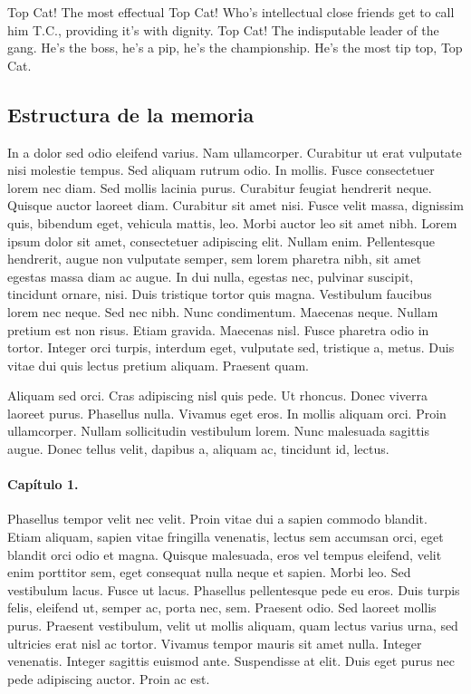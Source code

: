 Top Cat! The most effectual Top Cat! Who's intellectual close friends get to call him T.C., providing it's with dignity. Top Cat! The indisputable leader of the gang. He's the boss, he's a pip, he's the championship. He's the most tip top, Top Cat.

%
%
\subsection*{Estructura de la memoria}


In a dolor sed odio eleifend varius. Nam ullamcorper. Curabitur ut erat vulputate nisi molestie tempus. Sed aliquam rutrum odio. In mollis. Fusce consectetuer lorem nec diam. Sed mollis lacinia purus. Curabitur feugiat hendrerit neque. Quisque auctor laoreet diam. Curabitur sit amet nisi. Fusce velit massa, dignissim quis, bibendum eget, vehicula mattis, leo. Morbi auctor leo sit amet nibh. Lorem ipsum dolor sit amet, consectetuer adipiscing elit. Nullam enim. Pellentesque hendrerit, augue non vulputate semper, sem lorem pharetra nibh, sit amet egestas massa diam ac augue. In dui nulla, egestas nec, pulvinar suscipit, tincidunt ornare, nisi. Duis tristique tortor quis magna. Vestibulum faucibus lorem nec neque. Sed nec nibh. Nunc condimentum. Maecenas neque. Nullam pretium est non risus. Etiam gravida. Maecenas nisl. Fusce pharetra odio in tortor. Integer orci turpis, interdum eget, vulputate sed, tristique a, metus. Duis vitae dui quis lectus pretium aliquam. Praesent quam.

Aliquam sed orci. Cras adipiscing nisl quis pede. Ut rhoncus. Donec viverra laoreet purus. Phasellus nulla. Vivamus eget eros. In mollis aliquam orci. Proin ullamcorper. Nullam sollicitudin vestibulum lorem. Nunc malesuada sagittis augue. Donec tellus velit, dapibus a, aliquam ac, tincidunt id, lectus. 


\paragraph*{Capítulo 1.}
Phasellus tempor velit nec velit. Proin vitae dui a sapien commodo blandit. Etiam aliquam, sapien vitae fringilla venenatis, lectus sem accumsan orci, eget blandit orci odio et magna. Quisque malesuada, eros vel tempus eleifend, velit enim porttitor sem, eget consequat nulla neque et sapien. Morbi leo. Sed vestibulum lacus. Fusce ut lacus. Phasellus pellentesque pede eu eros. Duis turpis felis, eleifend ut, semper ac, porta nec, sem. Praesent odio. Sed laoreet mollis purus. Praesent vestibulum, velit ut mollis aliquam, quam lectus varius urna, sed ultricies erat nisl ac tortor. Vivamus tempor mauris sit amet nulla. Integer venenatis. Integer sagittis euismod ante. Suspendisse at elit. Duis eget purus nec pede adipiscing auctor. Proin ac est.

